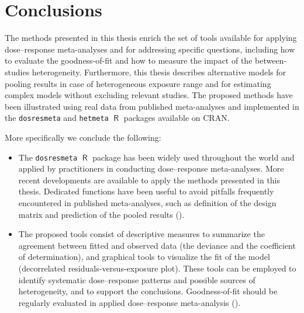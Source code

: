 \documentclass[11pt,a4paper,twoside,openany]{book}\usepackage{knitr}
\DeclareMathOperator{\R}{\textsf{R}}
\begin{document}
{{%

%

\chapter{Conclusions}

The methods presented in this thesis enrich the set of tools available for applying dose--response meta-analyses and for addressing specific questions, including how to evaluate the goodness-of-fit and how to measure the impact of the between-studies heterogeneity. Furthermore, this thesis describes alternative models for pooling results in case of heterogeneous exposure range and for estimating complex models without excluding relevant studies. The proposed methods have been illustrated using real data from published meta-analyses and implemented in the \texttt{dosresmeta} and \texttt{hetmeta} $\R$ packages available on CRAN. 

More specifically we conclude the following:

\begin{itemize}

\item The \texttt{dosresmeta} $\R$ package has been widely used throughout the world and applied by practitioners in conducting dose--response meta-analyses. More recent developments are available to apply the methods presented in this thesis. Dedicated functions have been useful to avoid pitfalls frequently encountered in published meta-analyses, such as definition of the design matrix and prediction of the pooled results ().

\item The proposed tools consist of descriptive measures to summarize the agreement between fitted and observed data (the deviance and the coefficient of determination), and graphical tools to visualize the fit of the model (decorrelated residuals-versus-exposure plot). These tools can be employed to identify systematic dose--response patterns and possible sources of heterogeneity, and to support the conclusions. Goodness-of-fit should be regularly evaluated in applied dose--response meta-analysis ().


\end{itemize}}}
\end{document}
